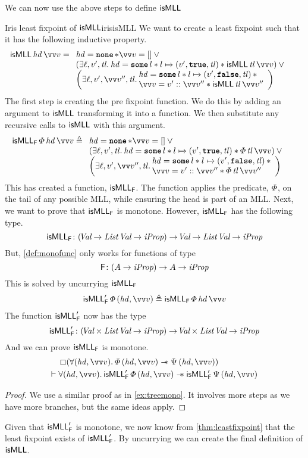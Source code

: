 \documentclass[thesis.tex]{subfiles}
\begin{document}
We can now use the above steps to define $\textsf{\upshape isMLL}$
\begin{example}{Iris least fixpoint of $\textsf{\upshape isMLL}$}{irisisMLL}
  We want to create a least fixpoint such that it has the following inductive property.
  \begin{align*}
    \isMLL\, \hd\, \vect{\val} & = \isMLLRecDef
  \end{align*}
  The first step is creating the pre fixpoint function. We do this by adding an argument to $\textsf{\upshape isMLL}$ transforming it into a function. We then substitute any recursive calls to $\textsf{\upshape isMLL}$ with this argument.
  \begin{align*}
    \isMLL_\hopred\, \pred\, \hd\, \vect{v} & \eqdef
    \isMLLFDef
  \end{align*}
  This has created a function, $\textsf{\upshape isMLL}_{\textsf{\upshape F}}$. The function applies the predicate, $\varPhi$, on the tail of any possible MLL, while ensuring the head is part of an MLL. Next, we want to prove that $\textsf{\upshape isMLL}_{\textsf{\upshape F}}$ is monotone. However, $\textsf{\upshape isMLL}_{\textsf{\upshape F}}$ has the following type.
  \[\textsf{\upshape isMLL}_{\textsf{\upshape F}}\colon (\kern-0.2em\textit{Val} \to \textit{List}\ \kern-0.2em\textit{Val} \to \textit{iProp}) \to \kern-0.2em\textit{Val} \to \textit{List}\ \kern-0.2em\textit{Val} \to \textit{iProp}\]
  But, \cref{def:monofunc} only works for functions of type
  \[\textsf{\upshape F}\colon (A \to \textit{iProp}) \to A \to \textit{iProp}\]
  This is solved by uncurrying $\textsf{\upshape isMLL}_{\textsf{\upshape F}}$
  \begin{align*}
    \isMLL'_\hopred\, \pred\, (\hd, \vect{\val}) \eqdef \isMLL_\hopred\, \pred\, \hd\, \vect{\val}
  \end{align*}
  The function $\textsf{\upshape isMLL}'_{\textsf{\upshape F}}$ now has the type
  \[\textsf{\upshape isMLL}'_{\textsf{\upshape F}}\colon (\kern-0.2em\textit{Val} \times \textit{List}\ \kern-0.2em\textit{Val} \to \textit{iProp}) \to  \kern-0.2em\textit{Val} \times \textit{List}\ \kern-0.2em\textit{Val} \to \textit{iProp}\]
  And we can prove $\textsf{\upshape isMLL}_{\textsf{\upshape F}}$ is monotone.
  \begin{align*}
              & \always(\All(\hd, \vect{\val}). \pred\,(\hd, \vect{\val}) \wand \predB\,(\hd, \vect{\val}))                              \\
    \proves{} & \All(\hd, \vect{\val}). \isMLL'_\hopred\, \pred\, (\hd, \vect{\val}) \wand \isMLL'_\hopred\, \predB\, (\hd, \vect{\val})
  \end{align*}
  \begin{proof}
    We use a similar proof as in \cref{ex:treemono}. It involves more steps as we have more branches, but the same ideas apply.
  \end{proof}
  Given that $\textsf{\upshape isMLL}'_{\textsf{\upshape F}}$ is monotone, we now know from \cref{thm:leastfixpoint} that the least fixpoint exists of $\textsf{\upshape isMLL}'_{\textsf{\upshape F}}$. By uncurrying we can create the final definition of $\textsf{\upshape isMLL}$.

\end{example}
\end{document}
